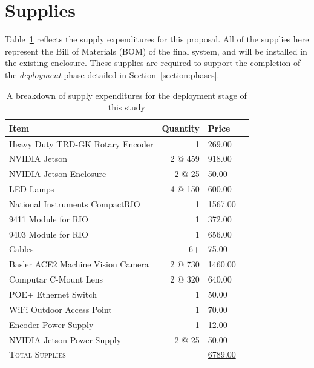 \documentclass[12pt]{article}
\begin{document}
{%
%
\section{Supplies}
\label{section:supplies}
Table~\ref{table:supplies} reflects the supply expenditures for this proposal. All of the supplies here represent the Bill of Materials (BOM) of the final system, and will be installed in the existing enclosure. These supplies are required to support the completion of the \textit{deployment} phase detailed in Section~\ref{section:phases}.\\

\begin{table}[H] %
\centering
\begin{tabular}{lrlr}
 	\toprule
 	Item & Quantity & Price \\
 	\midrule
	Heavy Duty TRD-GK Rotary Encoder & 1 & 269.00 \\
	NVIDIA Jetson & 2 @ 459 &918.00 \\
	NVIDIA Jetson Enclosure &2 @ 25 & 50.00 \\
	LED Lamps & 4 @ 150 & 600.00 \\
	National Instruments CompactRIO&1& 1567.00 \\
	9411 Module for RIO &1& 372.00 \\
	9403 Module for RIO &1& 656.00 \\
	Cables &6+& 75.00 \\
	Basler ACE2 Machine Vision Camera &2 @ 730& 1460.00  \\
	Computar C-Mount Lens &2 @ 320& 640.00 \\
	POE+ Ethernet Switch &1& 50.00 \\
	WiFi Outdoor Access Point &1& 70.00 \\
	Encoder Power Supply &1& 12.00 \\
	NVIDIA Jetson Power Supply &2 @ 25& 50.00 \\
	\midrule
	\midrule
	\textsc{Total Supplies}                      & & \underline{6789.00} \\
	\bottomrule
    \bottomrule                
\end{tabular}
\caption[Supply Budget Breakdown]{A breakdown of supply expenditures for the deployment stage of this study}
\label{table:supplies}
\end{table}





}
\end{document}
